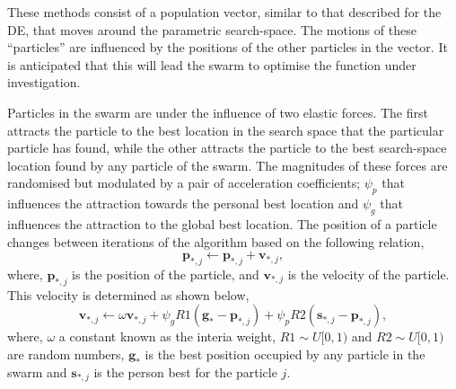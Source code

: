 These methods consist of a population vector, similar to that described for the DE, that moves around the parametric search-space.
The motions of these ``particles'' are influenced by the positions of the other particles in the vector.\autocite{poli_analysis_2008}
It is anticipated that this will lead the swarm to optimise the function under investigation.

Particles in the swarm are under the influence of two elastic forces.
The first attracts the particle to the best location in the search space that the particular particle has found, while the other attracts the particle to the best search-space location found by any particle of the swarm.
The magnitudes of these forces are randomised but modulated by a pair of acceleration coefficients; $\psi_p$ that influences the attraction towards the personal best location and $\psi_g$ that influences the attraction to the global best location.
The position of a particle changes between iterations of the algorithm based on the following relation,
%
\begin{equation}
\mathbf{p}_{*,j} \leftarrow \mathbf{p}_{*,j} + \mathbf{v}_{*,j},
\end{equation}
%
where, $\mathbf{p}_{*,j}$ is the position of the particle, and $\mathbf{v}_{*,j}$ is the velocity of the particle.
This velocity is determined as shown below,
%
\begin{equation}
\mathbf{v}_{*,j} \leftarrow \omega\mathbf{v}_{*,j} + \psi_gR1(\mathbf{g}_{*} - \mathbf{p}_{*,j}) + \psi_pR2(\mathbf{s}_{*,j} - \mathbf{p}_{*,j}),
\end{equation}
%
where, $\omega$ a constant known as the interia weight, $R1\sim U[0, 1)$ and $R2\sim U[0, 1)$ are random numbers, $\mathbf{g}_{*}$ is the best position occupied by any particle in the swarm and $\mathbf{s}_{*,j}$ is the person best for the particle $j$.

